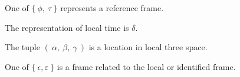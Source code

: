 

One of $ \{\ \phi,\ \tau\ \} $ represents a reference frame.

The representation of local time is $ \delta $.

The tuple $ (\ \alpha,\ \beta,\ \gamma\ ) $ is a location in local
three space.

One of $ \{\ \epsilon, \varepsilon\ \} $ is a frame related to the local or
identified frame.

\bye
